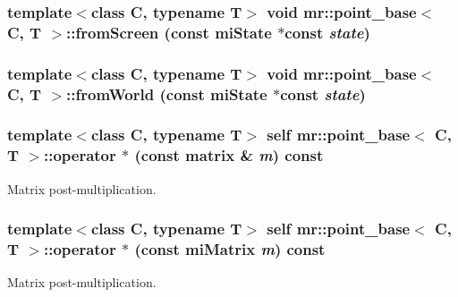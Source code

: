 \subsubsection{\setlength{\rightskip}{0pt plus 5cm}template$<$class C, typename T$>$ void {\bf mr::point\_\-base}$<$ C, T $>$::from\-Screen (const mi\-State $\ast$const {\em state})\hspace{0.3cm}{\tt  [inline]}}\label{structmr_1_1point__base_z74_10}


\subsubsection{\setlength{\rightskip}{0pt plus 5cm}template$<$class C, typename T$>$ void {\bf mr::point\_\-base}$<$ C, T $>$::from\-World (const mi\-State $\ast$const {\em state})\hspace{0.3cm}{\tt  [inline]}}\label{structmr_1_1point__base_z74_8}


\subsubsection{\setlength{\rightskip}{0pt plus 5cm}template$<$class C, typename T$>$ {\bf self} {\bf mr::point\_\-base}$<$ C, T $>$::operator $\ast$ (const {\bf matrix} \& {\em m}) const\hspace{0.3cm}{\tt  [inline]}}\label{structmr_1_1point__base_z78_5}


Matrix post-multiplication. 

\subsubsection{\setlength{\rightskip}{0pt plus 5cm}template$<$class C, typename T$>$ {\bf self} {\bf mr::point\_\-base}$<$ C, T $>$::operator $\ast$ (const mi\-Matrix {\em m}) const\hspace{0.3cm}{\tt  [inline]}}\label{structmr_1_1point__base_z78_3}


Matrix post-multiplication. 

